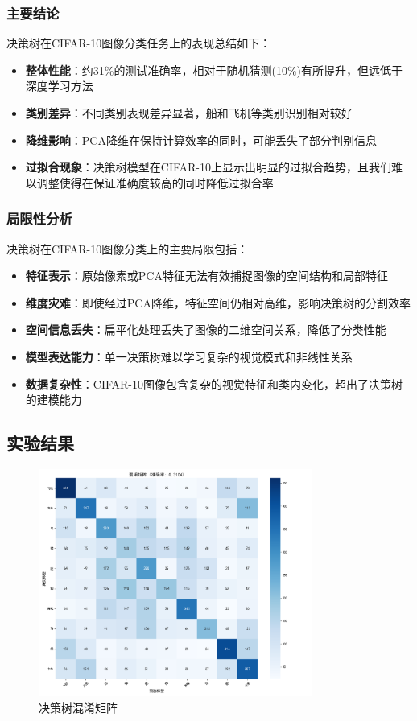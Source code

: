 \documentclass[UTF8]{report}
\theoremstyle{MyLineTheoremStyle} %
\theoremstyle{MyBlockTheoremStyle} %
\theoremstyle{MySubsubsectionStyle} %
\begin{document}
\subsubsection{主要结论}
决策树在CIFAR-10图像分类任务上的表现总结如下：
\begin{itemize}
    \item \textbf{整体性能}：约31\%的测试准确率，相对于随机猜测(10\%)有所提升，但远低于深度学习方法
    \item \textbf{类别差异}：不同类别表现差异显著，船和飞机等类别识别相对较好
    \item \textbf{降维影响}：PCA降维在保持计算效率的同时，可能丢失了部分判别信息
    \item \textbf{过拟合现象}：决策树模型在CIFAR-10上显示出明显的过拟合趋势，且我们难以调整使得在保证准确度较高的同时降低过拟合率
\end{itemize}

\subsubsection{局限性分析}
决策树在CIFAR-10图像分类上的主要局限包括：
\begin{itemize}
    \item \textbf{特征表示}：原始像素或PCA特征无法有效捕捉图像的空间结构和局部特征
    \item \textbf{维度灾难}：即使经过PCA降维，特征空间仍相对高维，影响决策树的分割效率
    \item \textbf{空间信息丢失}：扁平化处理丢失了图像的二维空间关系，降低了分类性能
    \item \textbf{模型表达能力}：单一决策树难以学习复杂的视觉模式和非线性关系
    \item \textbf{数据复杂性}：CIFAR-10图像包含复杂的视觉特征和类内变化，超出了决策树的建模能力
\end{itemize}
\subsection{实验结果}

\begin{figure}[H]
    \centering
    \includegraphics[width=0.8\textwidth]{dt_cm.png}
    \caption{决策树混淆矩阵}
    \label{fig:dt_confusion_matrix}
\end{figure}
\end{document}
